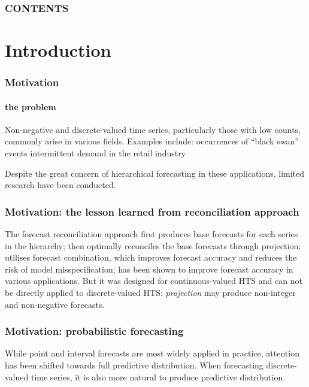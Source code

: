 \documentclass[12pt]{beamer}
\begin{document}
\begin{frame}
    \frametitle{CONTENTS}
    \tableofcontents
\end{frame}


\section{Introduction}
\begin{frame}
\frametitle{Motivation}
\framesubtitle{the problem}

\begin{outline}
\1 Non-negative and discrete-valued time series, particularly those with low counts, commonly arise in various fields. Examples include:
\2 occurrences of “black swan” events
\2 intermittent demand in the retail industry

\1 Despite the great concern of hierarchical forecasting in these applications, limited research have been conducted.


\end{outline}

\end{frame}

\begin{frame}
\frametitle{Motivation: the lesson learned from reconciliation approach}


\begin{outline}
    \0 The forecast reconciliation approach
    \1 first produces base forecasts for each series in the hierarchy; then optimally reconciles the base forecasts through projection;
    \1 utilises forecast combination, which improves forecast accuracy and reduces the risk of model misspecification;
    \1 has been shown to improve forecast accuracy in various applications.
    \0 But it was designed for continuous-valued HTS and can not be directly applied to discrete-valued HTS: \textit{projection} may produce non-integer and non-negative forecasts.
\end{outline}

\end{frame}


\begin{frame}
\frametitle{Motivation: probabilistic forecasting}
    \begin{outline}

        \1 While point and interval forecasts are most widely applied in practice, attention has been shifted towards full predictive distribution.
        \1 When forecasting discrete-valued time series, it is also more natural to produce predictive distribution.

    \end{outline}

\end{frame}
\end{document}
